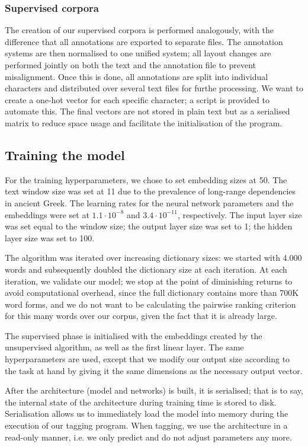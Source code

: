 \subsubsection{Supervised corpora}
\label{sec:supcorp}
The creation of our supervised corpora is performed analogously, with
the difference that all annotations are exported to separate
files. The annotation systems are then normalised to one unified
system; all layout changes are performed jointly on both the text and
the annotation file to prevent misalignment. Once this is done, all
annotations are split into individual characters and distributed over
several text files for furthe processing. We want to create a one-hot
vector for each specific character; a script is provided to automate
this. The final vectors are not stored in plain text but as a
serialised matrix to reduce space usage and facilitate the
initialisation of the program.

\subsection{Training the model}
\label{sec:createmodel}

For the training hyperparameters, we chose to set embedding sizes at
50. The text window size was set at 11 due to the prevalence of
long-range dependencies in ancient Greek. The learning rates for the
neural network parameters and the embeddings were set at $1.1 \cdot
10^{-8}$ and $3.4 \cdot 10^{-11}$, respectively. The input layer size
was set equal to the window size; the output layer size was set to 1;
the hidden layer size was set to 100.

The algorithm was iterated over increasing dictionary sizes: we
started with 4.000 words and subsequently doubled the dictionary size
at each iteration. At each iteration, we validate our model; we stop
at the point of diminishing returns to avoid computational overhead,
since the full dictionary contains more than 700K word forms, and we
do not want to be calculating the pairwise ranking criterion for this
many words over our corpus, given the fact that it is already large.

The supervised phase is initialised with the embeddings created by the
unsupervised algorithm, as well as the first linear layer. The same
hyperparameters are used, except that we modify our output size
according to the task at hand by giving it the same dimensions as the
necessary output vector.

After the architecture (model and networks) is built, it is
serialised; that is to say, the internal state of the architecture
during training time is stored to disk. Serialisation allows us to
immediately load the model into memory during the execution of our
tagging program. When tagging, we use the architecture in a read-only
manner, i.e. we only predict and do not adjust parameters any more.

